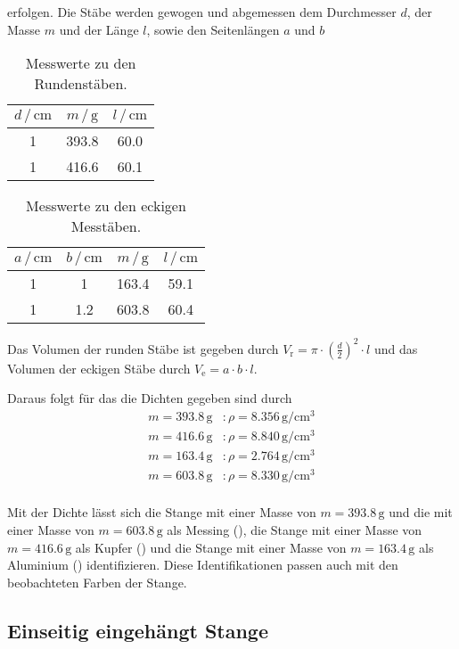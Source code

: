 \noindent
erfolgen. Die Stäbe werden gewogen und abgemessen dem Durchmesser $d$, der Masse $m$ und der Länge $l$, sowie den Seitenlängen $a$ und $b$

\begin{table}
	\centering
	\caption{Messwerte zu den Rundenstäben.} 
	\label{tab:vana} 
	\begin{tabular}{c c c}
	\toprule
	$d \, / \, \si{\centi\meter}$ & $m \, / \, \si{\gram} $ & $l \, / \, \si{\centi\meter}$\\
	\midrule
    1   &   393.8   &   60.0 \\
    1   &   416.6   &   60.1 \\
\bottomrule
	\end{tabular}
\end{table}

\begin{table}
	\centering
	\caption{Messwerte zu den eckigen Messtäben.} 
	\label{tab:vana} 
	\begin{tabular}{c c c c}
	\toprule
	$a \, / \, \si{\centi\meter}$ & $b \, / \, \si{\centi\meter}$ & $m \, / \, \si{\gram} $ & $l \, / \, \si{\centi\meter}$\\
	\midrule
    1   &   1   &   163.4   &   59.1 \\
    1   &   1.2   &  603.8  &   60.4 \\
\bottomrule
	\end{tabular}
\end{table}

\noindent
Das Volumen der runden Stäbe ist gegeben durch $V_\text{r} = \pi \cdot \left( \frac{d}{2} \right)^2 \cdot l$ und das Volumen der eckigen Stäbe durch 
$V_\text{e} = a \cdot b \cdot l$.

\noindent
Daraus folgt für das die Dichten gegeben sind durch
\begin{align*}
    m = 393.8 \, \si{\gram} &: \rho = 8.356\, \si{\gram\per\centi\meter\tothe{3}}\\
    m = 416.6 \, \si{\gram} &: \rho = 8.840\, \si{\gram\per\centi\meter\tothe{3}}\\
    m = 163.4 \, \si{\gram} &: \rho = 2.764\, \si{\gram\per\centi\meter\tothe{3}}\\
    m = 603.8 \, \si{\gram} &: \rho = 8.330\, \si{\gram\per\centi\meter\tothe{3}}\\
\end{align*}    

\noindent
Mit der Dichte lässt sich die Stange mit einer Masse von $m = 393.8 \, \si{\gram}$ und die mit einer Masse von $m = 603.8 \, \si{\gram}$ als Messing (\cite{Messing}), 
die Stange mit einer Masse von $m = 416.6 \, \si{\gram}$ als Kupfer (\cite{Kupfer}) und
die Stange mit einer Masse von $m = 163.4 \, \si{\gram}$ als Aluminium (\cite{Aluminium}) identifizieren. Diese Identifikationen passen auch mit den beobachteten Farben
der Stange.

\subsection{Einseitig eingehängt Stange}






